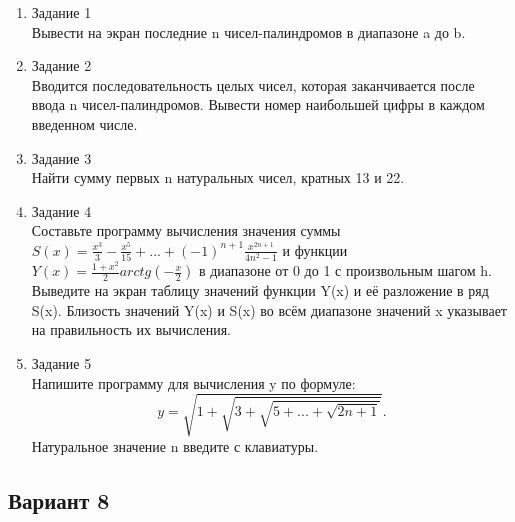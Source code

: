 \documentclass[a4paper]{article}
\begin{document}
	\begin{enumerate} 
		\item Задание 1 \\
			Вывести на экран последние n чисел-палиндромов в диапазоне a до b.\\
		\item Задание 2\\
			Вводится последовательность целых чисел, которая заканчивается после ввода n чисел-палиндромов.
			 Вывести номер наибольшей цифры в каждом введенном числе.\\
		\item Задание 3 \\
			Найти сумму первых n натуральных чисел, кратных 13 и 22.\\
		\item Задание 4 \\
			Составьте программу вычисления значения суммы  $S(x)=\frac{x^3}{3}-\frac{x^5}{15}+...+(-1)^{n+1}\frac{x^{2n+1}}{4n^2-1}$
			и функции $Y(x)=\frac{1+x^2}{2}arctg(-\frac{x}{2})$ в диапазоне от 0 до 1
			с произвольным шагом h. Выведите на экран таблицу значений функции Y(x) и её разложение в ряд S(x). Близость значений Y(x) и S(x) во всём диапазоне
			значений x указывает на правильность их вычисления.\\
		\item Задание 5 \\
			Напишите программу для вычисления y по формуле:
			$$y=\sqrt{1+\sqrt{3+\sqrt{5+...+\sqrt{2n+1}}}}.$$
			Натуральное значение n введите с клавиатуры.\\
	\end{enumerate}
	
	\begin{center}
		\subsection*{Вариант 8}
	\end{center}
\end{document}
